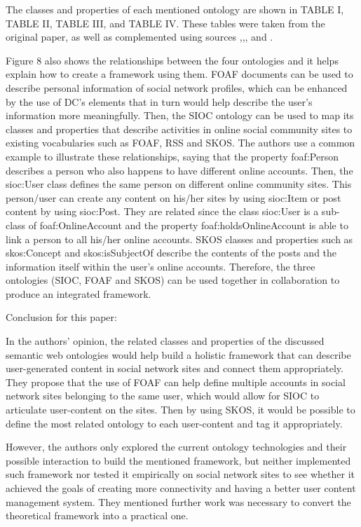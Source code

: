 \documentclass[10pt,journal,compsoc]{IEEEtran}
\begin{document}
The classes and properties of each mentioned ontology are shown in TABLE I, TABLE II, TABLE III, and TABLE IV. These tables were taken from the original paper, as well as complemented using sources \cite{skos},\cite{foaf},\cite{sioc}, and \cite{dcmi}. 

Figure 8 also shows the relationships between the four ontologies and it helps explain how to create a framework using them. FOAF documents can be used to describe personal information of social network profiles, which can be enhanced by the use of DC’s elements that in turn would help describe the user’s information more meaningfully. Then, the SIOC ontology can be used to map its classes and properties that describe activities in online social community sites to existing vocabularies such as FOAF, RSS and SKOS. The authors use a common example to illustrate these relationships, saying that the property foaf:Person describes a person who also happens to have different online accounts. Then, the sioc:User class defines the same person on different online community sites. This person/user can create any content on his/her sites by using sioc:Item or post content by using sioc:Post. They are related since the class sioc:User is a sub-class of foaf:OnlineAccount and the property foaf:holdsOnlineAccount is able to link a person to all his/her online accounts. SKOS classes and properties such as skos:Concept and skos:isSubjectOf describe the contents of the posts and the information itself within the user’s online accounts. Therefore, the three ontologies (SIOC, FOAF and SKOS) can be used together in collaboration to produce an integrated framework.

Conclusion for this paper:

In the authors' opinion, the related classes and properties of the discussed semantic web ontologies would help build a holistic framework that can describe user-generated content in social network sites and connect them appropriately. They propose that the use of FOAF can help define multiple accounts in social network sites belonging to the same user, which would allow for SIOC to articulate user-content on the sites. Then by using SKOS, it would be possible to define the most related ontology to each user-content and tag it appropriately.

However, the authors only explored the current ontology technologies and their possible interaction to build the mentioned framework, but neither implemented such framework nor tested it empirically on social network sites to see whether it achieved the goals of creating more connectivity and having a better user content management system. They mentioned further work was necessary to convert the theoretical framework into a practical one.
\end{document}
